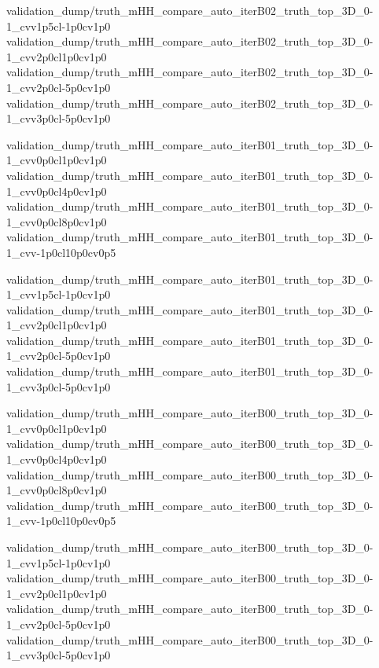 {validation_dump/truth_mHH_compare_auto_iterB02_truth_top_3D_0-1_cvv1p5cl-1p0cv1p0}
{validation_dump/truth_mHH_compare_auto_iterB02_truth_top_3D_0-1_cvv2p0cl1p0cv1p0}
{validation_dump/truth_mHH_compare_auto_iterB02_truth_top_3D_0-1_cvv2p0cl-5p0cv1p0}
{validation_dump/truth_mHH_compare_auto_iterB02_truth_top_3D_0-1_cvv3p0cl-5p0cv1p0}

{validation_dump/truth_mHH_compare_auto_iterB01_truth_top_3D_0-1_cvv0p0cl1p0cv1p0}
{validation_dump/truth_mHH_compare_auto_iterB01_truth_top_3D_0-1_cvv0p0cl4p0cv1p0}
{validation_dump/truth_mHH_compare_auto_iterB01_truth_top_3D_0-1_cvv0p0cl8p0cv1p0}
{validation_dump/truth_mHH_compare_auto_iterB01_truth_top_3D_0-1_cvv-1p0cl10p0cv0p5}

{validation_dump/truth_mHH_compare_auto_iterB01_truth_top_3D_0-1_cvv1p5cl-1p0cv1p0}
{validation_dump/truth_mHH_compare_auto_iterB01_truth_top_3D_0-1_cvv2p0cl1p0cv1p0}
{validation_dump/truth_mHH_compare_auto_iterB01_truth_top_3D_0-1_cvv2p0cl-5p0cv1p0}
{validation_dump/truth_mHH_compare_auto_iterB01_truth_top_3D_0-1_cvv3p0cl-5p0cv1p0}

{validation_dump/truth_mHH_compare_auto_iterB00_truth_top_3D_0-1_cvv0p0cl1p0cv1p0}
{validation_dump/truth_mHH_compare_auto_iterB00_truth_top_3D_0-1_cvv0p0cl4p0cv1p0}
{validation_dump/truth_mHH_compare_auto_iterB00_truth_top_3D_0-1_cvv0p0cl8p0cv1p0}
{validation_dump/truth_mHH_compare_auto_iterB00_truth_top_3D_0-1_cvv-1p0cl10p0cv0p5}

{validation_dump/truth_mHH_compare_auto_iterB00_truth_top_3D_0-1_cvv1p5cl-1p0cv1p0}
{validation_dump/truth_mHH_compare_auto_iterB00_truth_top_3D_0-1_cvv2p0cl1p0cv1p0}
{validation_dump/truth_mHH_compare_auto_iterB00_truth_top_3D_0-1_cvv2p0cl-5p0cv1p0}
{validation_dump/truth_mHH_compare_auto_iterB00_truth_top_3D_0-1_cvv3p0cl-5p0cv1p0}

